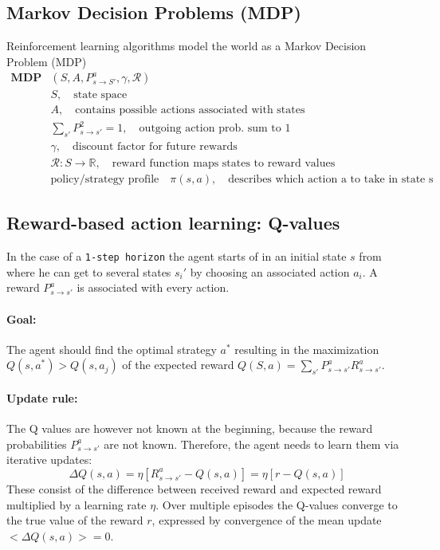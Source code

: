 \documentclass[11pt]{article}
\begin{document}
\subsection{Markov Decision Problems (MDP)}
Reinforcement learning algorithms model the world as a Markov Decision Problem (MDP) 
\begin{align*}
\mathbf{MDP}&\left(S, A, P_{s\rightarrow S'}^a, \gamma, \mathcal{R}\right)\\
&S,\quad \text{state space}\\
&A,\quad \text{contains possible actions associated with states}\\
&\sum_{s'}P_{s\rightarrow s'}^2=1,\quad\text{outgoing action prob. sum to 1}\\
&\gamma, \quad\text{discount factor for future rewards}\\
&\mathcal{R}:S\rightarrow\mathbb{R}, \quad \text{reward function maps states to reward values}\\
&\text{policy/strategy profile}\quad \pi(s,a), \quad \text{describes which action a to take in state s}
\end{align*}

\subsection{Reward-based action learning: Q-values}
In the case of a \texttt{1-step horizon} the agent starts of in an initial state $s$ from where he can get to several states $s_i'$ by choosing an associated action $a_i$. A reward $P_{s \rightarrow s'}^a$ is associated with every action.
\paragraph{Goal:} The agent should find the optimal strategy $a^*$ resulting in the maximization $Q(s,a^*) > Q(s, a_j)$ of the expected reward $Q(S,a)=\sum_{s'} P_{s \rightarrow s'}^a R_{s \rightarrow s'}^a$.

\paragraph{Update rule:}
The Q values are however not known at the beginning, because the reward probabilities $P_{s \rightarrow s'}^a$ are not known. Therefore, the agent needs to learn them via iterative updates: 
\[
\Delta Q(s,a) = \eta\left[R_{s \rightarrow s'}^a-Q(s,a)\right]=\eta\left[r-Q(s,a)\right]
\]
These consist of the difference between received reward and expected reward multiplied by a learning rate $\eta$. Over multiple episodes the Q-values converge to the true value of the reward $r$, expressed by convergence of the mean update $<\Delta Q(s,a)> = 0$.
\end{document}
